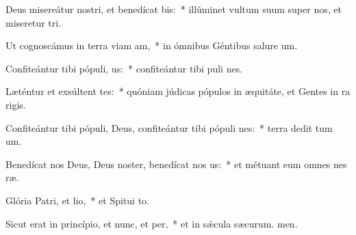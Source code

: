 \item Deus misereátur nostri, et benedícat bis:~* illúminet vultum suum super nos, et miseretur tri.
\item Ut cognoscámus in terra viam am,~* in ómnibus Géntibus salure um.
\item Confiteántur tibi pópuli, us:~* confiteántur tibi puli nes.
\item Læténtur et exsúltent tes:~* quóniam júdicas pópulos in æquitáte, et Gentes in ra rigis.
\item Confiteántur tibi pópuli, Deus, confiteántur tibi pópuli nes:~* terra dedit tum um.
\item Benedícat nos Deus, Deus noster, benedícat nos us:~* et métuant eum omnes nes ræ.
\item Glória Patri, et lio,~* et Spitui to.
\item Sicut erat in princípio, et nunc, et per,~* et in sǽcula sæcurum. men.
